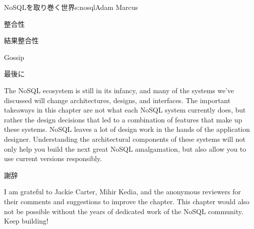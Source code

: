 \begin{aosachapter}{NoSQLを取り巻く世界}{s:nosql}{Adam Marcus}
\begin{aosasect1}{整合性}
\begin{aosasect2}{結果整合性}
\begin{aosasect3}{Gossip}
\end{aosasect3}

\end{aosasect2}

\end{aosasect1}

\begin{aosasect1}{最後に}

The NoSQL ecosystem is still in its infancy, and many of the
systems we've discussed will change architectures, designs, and
interfaces.  The important takeaways in this chapter are not what
each NoSQL system currently does, but rather the design decisions that
led to a combination of features that make up these systems.  NoSQL
leaves a lot of design work in the hands of the application designer.
Understanding the architectural components of these systems will not
only help you build the next great NoSQL amalgamation, but also allow
you to use current versions responsibly.

\end{aosasect1}

\begin{aosasect1}{謝辞}

I am grateful to Jackie Carter, Mihir Kedia, and the anonymous
reviewers for their comments and suggestions to improve the chapter.
This chapter would also not be possible without the years of dedicated
work of the NoSQL community.  Keep building!

\end{aosasect1}

\end{aosachapter}

